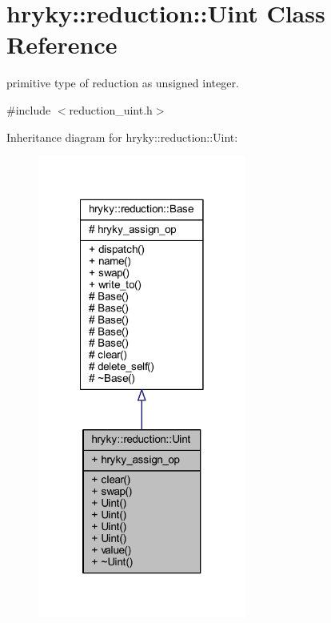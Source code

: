 \hypertarget{classhryky_1_1reduction_1_1_uint}{\section{hryky\-:\-:reduction\-:\-:Uint Class Reference}
\label{classhryky_1_1reduction_1_1_uint}
}


primitive type of reduction as unsigned integer.  




{\ttfamily \#include $<$reduction\-\_\-uint.\-h$>$}



Inheritance diagram for hryky\-:\-:reduction\-:\-:Uint\-:
\nopagebreak
\begin{figure}[H]
\begin{center}
\leavevmode
\includegraphics[width=194pt]{classhryky_1_1reduction_1_1_uint__inherit__graph}
\end{center}
\end{figure}
